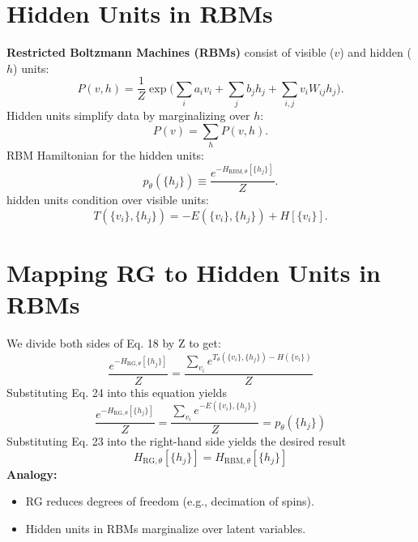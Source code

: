 \documentclass{antclass}
\begin{document}
\pagebreak

\section{Hidden Units in RBMs}

\textbf{Restricted Boltzmann Machines (RBMs)} consist of visible ($v$) and hidden ($h$) units:
\begin{equation}
P(v, h) = \frac{1}{Z} \exp \big( \sum_i a_i v_i + \sum_j b_j h_j + \sum_{i, j} v_i W_{ij} h_j \big).
\end{equation}
Hidden units simplify data by marginalizing over $h$:
\begin{equation}
P(v) = \sum_h P(v, h).
\end{equation}
RBM Hamiltonian for the hidden units:
\begin{equation}
p_\theta(\{h_j\}) \equiv \frac{e^{-H_{\text{RBM}, \theta}[\{h_j\}]}}{Z}.
\end{equation}
hidden units condition over visible units:
\begin{equation}
T(\{v_i\}, \{h_j\}) = -E(\{v_i\}, \{h_j\}) + H[\{v_i\}].
\end{equation}

\pagebreak

\section{Mapping RG to Hidden Units in RBMs}

We divide both sides of Eq. 18 by Z to get:
\begin{equation}
\frac{e^{-H_{\text{RG}, \theta}[\{h_j\}]}}{Z} = \frac{\sum_{v_i}e^{T_\theta(\{v_i\}, \{h_j\}) - H(\{v_i\})}}{Z}
\end{equation}
Substituting Eq. 24 into this equation yields
\begin{equation}
\frac{e^{-H_{\text{RG}, \theta}[\{h_j\}]}}{Z} = \frac{\sum_{v_i}e^{-E(\{v_i\}, \{h_j\})}}{Z} = p_\theta(\{h_j\})
\end{equation}
Substituting Eq. 23 into the right-hand side yields the
desired result
\begin{equation}
H_{\text{RG}, \theta}[\{h_j\}] = H_{\text{RBM}, \theta}[\{h_j\}]
\end{equation}
\textbf{Analogy:}
\begin{itemize}
\item RG reduces degrees of freedom (e.g., decimation of spins).
\item Hidden units in RBMs marginalize over latent variables.
\end{itemize}
\end{document}
